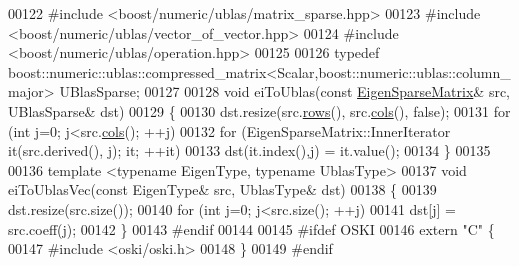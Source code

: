 \begin{DoxyCode}
00122 \textcolor{preprocessor}{#include <boost/numeric/ublas/matrix\_sparse.hpp>}
00123 \textcolor{preprocessor}{#include <boost/numeric/ublas/vector\_of\_vector.hpp>}
00124 \textcolor{preprocessor}{#include <boost/numeric/ublas/operation.hpp>}
00125 
00126 \textcolor{keyword}{typedef} boost::numeric::ublas::compressed\_matrix<Scalar,boost::numeric::ublas::column\_major> UBlasSparse;
00127 
00128 \textcolor{keywordtype}{void} eiToUblas(\textcolor{keyword}{const} \hyperlink{group___sparse_core___module}{EigenSparseMatrix}& src, UBlasSparse& dst)
00129 \{
00130   dst.resize(src.\hyperlink{group___sparse_core___module_a62e61bb861eee306d5b069ce652b5aa5}{rows}(), src.\hyperlink{group___sparse_core___module_aa391750e3c530227e4a5c3c52e959975}{cols}(), \textcolor{keyword}{false});
00131   \textcolor{keywordflow}{for} (\textcolor{keywordtype}{int} j=0; j<src.\hyperlink{group___sparse_core___module_aa391750e3c530227e4a5c3c52e959975}{cols}(); ++j)
00132     \textcolor{keywordflow}{for} (EigenSparseMatrix::InnerIterator it(src.derived(), j); it; ++it)
00133       dst(it.index(),j) = it.value();
00134 \}
00135 
00136 \textcolor{keyword}{template} <\textcolor{keyword}{typename} EigenType, \textcolor{keyword}{typename} UblasType>
00137 \textcolor{keywordtype}{void} eiToUblasVec(\textcolor{keyword}{const} EigenType& src, UblasType& dst)
00138 \{
00139   dst.resize(src.size());
00140   \textcolor{keywordflow}{for} (\textcolor{keywordtype}{int} j=0; j<src.size(); ++j)
00141       dst[j] = src.coeff(j);
00142 \}
00143 \textcolor{preprocessor}{#endif}
00144 
00145 \textcolor{preprocessor}{#ifdef OSKI}
00146 \textcolor{keyword}{extern} \textcolor{stringliteral}{"C"} \{
00147 \textcolor{preprocessor}{#include <oski/oski.h>}
00148 \}
00149 \textcolor{preprocessor}{#endif}
\end{DoxyCode}
